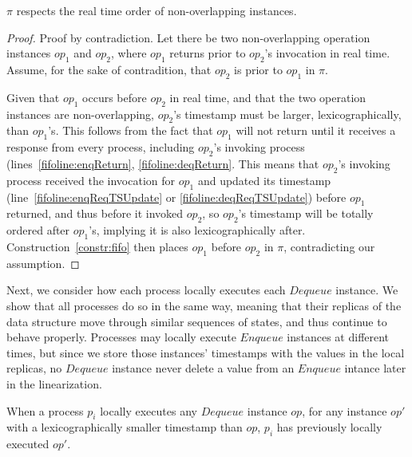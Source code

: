 \documentclass[a4paper,anonymous,USenglish]{lipics-v2021}
\theoremstyle{definition}
\begin{document}
\begin{lemma}\label{fifolem:realTimeOrder}
  $\pi$ respects the real time order of non-overlapping instances.
\end{lemma}
\begin{proof}
  Proof by contradiction. Let there be two non-overlapping operation instances $op_1$ and $op_2$, where $op_1$ returns prior to $op_2$'s invocation in real time.  Assume, for the sake of contradition, that $op_2$ is prior to $op_1$ in $\pi$.
  
  Given that $op_1$ occurs before $op_2$ in real time, and that the two operation instances are non-overlapping, $op_2$'s timestamp must be larger, lexicographically, than $op_1$'s.  This follows from the fact that $op_1$ will not return until it receives a response from every process, including $op_2$'s invoking process (lines~\ref{fifoline:enqReturn}, \ref{fifoline:deqReturn}.  This means that $op_2$'s invoking process received the invocation for $op_1$ and updated its timestamp (line~\ref{fifoline:enqReqTSUpdate} or \ref{fifoline:deqReqTSUpdate}) before $op_1$ returned, and thus before it invoked $op_2$, so $op_2$'s timestamp will be totally ordered after $op_1$'s, implying it is also lexicographically after.  Construction~\ref{constr:fifo} then places $op_1$ before $op_2$ in $\pi$, contradicting our assumption.
\end{proof}

Next, we consider how each process locally executes each $Dequeue$ instance.  We show that all processes do so in the same way, meaning that their replicas of the data structure move through similar sequences of states, and thus continue to behave properly.  Processes may locally execute $Enqueue$ instances at different times, but since we store those instances' timestamps with the values in the local replicas, no $Dequeue$ instance never delete a value from an $Enqueue$ intance later in the linearization.

\begin{lemma}\label{fifolem:prevLocalExec}
  When a process $p_i$ locally executes any $Dequeue$ instance $op$, for any instance $op'$ with a lexicographically smaller timestamp than $op$, $p_i$ has previously locally executed $op'$.
\end{lemma}
\end{document}
